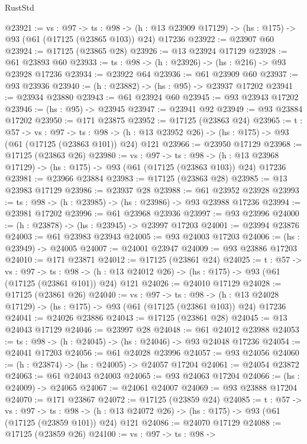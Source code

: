 \begin{lexlean}{RustStd}
\begin{coremodule}
@23921 := {vs : @97} ->
  {ts : @98} ->
  (h : @13 @23909 @17129) -> (hs : @175) -> @93 (@61 (@17125 (@23865 @103)) @24) @17236
@23922 := @23907 @60
@23924 := @17125 (@23865 @28)
@23926 := @13 @23924 @17129
@23928 := @61 @23893 @60
@23933 := {ts : @98} -> (h : @23926) -> (hs : @216) -> @93 @23928 @17236
@23934 := @23922 @64
@23936 := @61 @23909 @60
@23937 := @93 @23936
@23940 := (h : @23882) -> (hs : @95) -> @23937 @17202
@23941 := @23934 @23880
@23943 := @61 @23924 @60
@23945 := @93 @23943 @17202
@23946 := (hs : @95) -> @23945
@23947 := @23941 @92
@23949 := @93 @23884 @17202
@23950 := @171 @23875
@23952 := @17125 (@23863 @24)
@23965 := {t : @57} ->
  {vs : @97} ->
  {ts : @98} -> (h : @13 @23952 @26) -> (hs : @175) -> @93 (@61 (@17125 (@23863 @101)) @24) @121
@23966 := @23950 @17129
@23968 := @17125 (@23863 @26)
@23980 := {vs : @97} ->
  {ts : @98} ->
  (h : @13 @23968 @17129) -> (hs : @175) -> @93 (@61 (@17125 (@23863 @103)) @24) @17236
@23981 := @23966 @23884
@23983 := @17125 (@23863 @28)
@23985 := @13 @23983 @17129
@23986 := @23937 @28
@23988 := @61 @23952 @23928
@23993 := {ts : @98} -> (h : @23985) -> (hs : @23986) -> @93 @23988 @17236
@23994 := @23981 @17202
@23996 := @61 @23968 @23936
@23997 := @93 @23996
@24000 := (h : @23878) -> (hs : @23945) -> @23997 @17203
@24001 := @23994 @23876
@24003 := @61 @23983 @23943
@24005 := @93 @24003 @17203
@24006 := (hs : @23949) -> @24005
@24007 := @24001 @23947
@24009 := @93 @23886 @17203
@24010 := @171 @23871
@24012 := @17125 (@23861 @24)
@24025 := {t : @57} ->
  {vs : @97} ->
  {ts : @98} -> (h : @13 @24012 @26) -> (hs : @175) -> @93 (@61 (@17125 (@23861 @101)) @24) @121
@24026 := @24010 @17129
@24028 := @17125 (@23861 @26)
@24040 := {vs : @97} ->
  {ts : @98} ->
  (h : @13 @24028 @17129) -> (hs : @175) -> @93 (@61 (@17125 (@23861 @103)) @24) @17236
@24041 := @24026 @23886
@24043 := @17125 (@23861 @28)
@24045 := @13 @24043 @17129
@24046 := @23997 @28
@24048 := @61 @24012 @23988
@24053 := {ts : @98} -> (h : @24045) -> (hs : @24046) -> @93 @24048 @17236
@24054 := @24041 @17203
@24056 := @61 @24028 @23996
@24057 := @93 @24056
@24060 := (h : @23874) -> (hs : @24005) -> @24057 @17204
@24061 := @24054 @23872
@24063 := @61 @24043 @24003
@24065 := @93 @24063 @17204
@24066 := (hs : @24009) -> @24065
@24067 := @24061 @24007
@24069 := @93 @23888 @17204
@24070 := @171 @23867
@24072 := @17125 (@23859 @24)
@24085 := {t : @57} ->
  {vs : @97} ->
  {ts : @98} -> (h : @13 @24072 @26) -> (hs : @175) -> @93 (@61 (@17125 (@23859 @101)) @24) @121
@24086 := @24070 @17129
@24088 := @17125 (@23859 @26)
@24100 := {vs : @97} ->
  {ts : @98} ->

\end{coremodule}
\end{lexlean}
